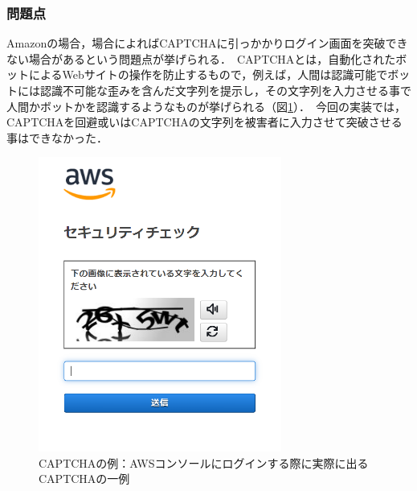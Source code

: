 \documentclass[dvipdfmx,twocolumn]{jsarticle}
\begin{document}
            \subsubsection{問題点}
                Amazonの場合，場合によればCAPTCHAに引っかかりログイン画面を突破できない場合があるという問題点が挙げられる．\
                CAPTCHAとは，自動化されたボットによるWebサイトの操作を防止するもので，例えば，人間は認識可能でボットには認識不可能な歪みを含んだ文字列を提示し，その文字列を入力させる事で人間かボットかを認識するようなものが挙げられる（図\ref{captcha}）．\
                今回の実装では，CAPTCHAを回避或いはCAPTCHAの文字列を被害者に入力させて突破させる事はできなかった．\
                \begin{figure}[h]
                    \centering
                    \includegraphics[width=8cm]{img/captcha.png}
                    \caption{CAPTCHAの例：AWSコンソールにログインする際に実際に出るCAPTCHAの一例}
                    \label{captcha}
                \end{figure}
\end{document}
